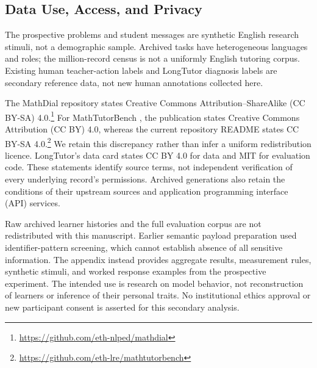 \subsection{Data Use, Access, and Privacy}
\label{app:data-use}
The prospective problems and student messages are synthetic English research
stimuli, not a demographic sample. Archived tasks have heterogeneous languages
and roles; the million-record census is not a uniformly English tutoring
corpus. Existing human teacher-action labels and LongTutor diagnosis labels
are secondary reference data, not new human annotations collected here.

The MathDial repository \citep{macina2023mathdial} states Creative Commons
Attribution--ShareAlike (CC BY-SA) 4.0.\footnote{\url{https://github.com/eth-nlped/mathdial}}
For MathTutorBench \citep{macina2025mathtutorbench}, the publication states
Creative Commons Attribution (CC BY) 4.0, whereas the current repository README
states CC BY-SA 4.0.\footnote{\url{https://github.com/eth-lre/mathtutorbench}}
We retain this discrepancy rather than infer a uniform redistribution licence.
LongTutor's data card \citep{li2026longtutor} states CC BY 4.0 for data and MIT
for evaluation code. These statements identify source terms, not independent
verification of every underlying record's permissions. Archived generations
also retain the conditions of their upstream sources and application programming
interface (API) services.

Raw archived learner histories and the full evaluation corpus are not
redistributed with this manuscript. Earlier semantic payload preparation used
identifier-pattern screening, which cannot establish absence of all sensitive
information. The appendix instead provides aggregate results, measurement
rules, synthetic stimuli, and worked response examples from the prospective
experiment. The intended use is research on model behavior, not reconstruction
of learners or inference of their personal traits. No institutional ethics
approval or new participant consent is asserted for this secondary analysis.
